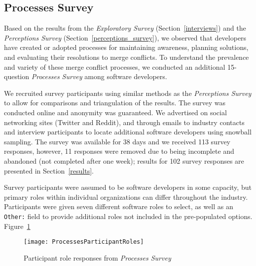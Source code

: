 \subsection{Processes Survey}\label{processes_survey}

Based on the results from the \textit{Exploratory Survey} (Section~\ref{interviews}) and the \textit{Perceptions Survey} (Section~\ref{perceptions_survey}), we observed that developers have created or adopted processes for maintaining awareness, planning solutions, and evaluating their resolutions to merge conflicts.
To understand the prevalence and variety of these merge conflict processes, we conducted an additional 15-question \textit{Processes Survey} among software developers.

We recruited survey participants using similar methods as the \textit{Perceptions Survey} to allow for comparisons and triangulation of the results.
The survey was conducted online and anonymity was guaranteed.
We advertised on social networking sites (Twitter and Reddit), and through emails to industry contacts and interview participants to locate additional software developers using snowball sampling.
The survey was available for 38 days and we received 113 survey responses, however, 11 responses were removed due to being incomplete and abandoned (not completed after one week); results for 102 survey responses are presented in Section~\ref{results}.

Survey participants were assumed to be software developers in some capacity, but primary roles within individual organizations can differ throughout the industry.
Participants were given seven different software roles to select, as well as an \texttt{Other:} field to provide additional roles not included in the pre-populated options.
Figure~\ref{processes_roles}

\begin{figure}[!htbp]
\centering
\texttt{[image: ProcessesParticipantRoles]}
\caption{Participant role responses from \textit{Processes Survey}}
\label{processes_roles}
\end{figure}

